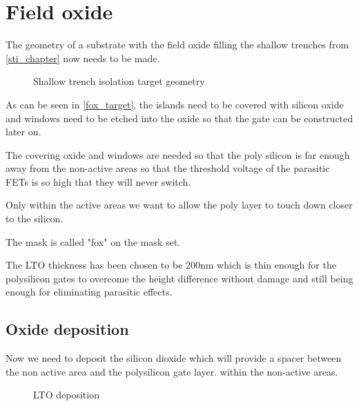 \section{Field oxide}\label{fox_chapter}

The geometry of a substrate with the field oxide filling the shallow trenches from \autoref{sti_chapter} now needs to be made.

\begin{figure}[H]
	\centering
	\begin{tikzpicture}[node distance = 3cm, auto, thick,scale=\CrossAndTopSectionBig, every node/.style={transform shape}]
		
	\end{tikzpicture}
	\caption{Shallow trench isolation target geometry}
	\label{fox_target}
\end{figure}

As can be seen in \autoref{fox_target}, the islands need to be covered with silicon oxide and windows need to be etched into the oxide so that the gate can be constructed later on.

The covering oxide and windows are needed so that the poly silicon is far enough away from the non-active areas so that the threshold voltage of the parasitic FETs is so high that they will never switch.

Only within the active areas we want to allow the poly layer to touch down closer to the silicon.

The mask is called "fox" on the mask set.

The LTO thickness has been chosen to be 200nm which is thin enough for the polysilicon gates to overcome the height difference without damage and still being enough for eliminating parasitic effects.

\newpage

\subsection{Oxide deposition}

Now we need to deposit the silicon dioxide which will provide a spacer between the non active area and the polysilicon gate layer. within the non-active areas.

\begin{figure}[H]
	\centering
	\begin{tikzpicture}[node distance = 3cm, auto, thick,scale=\CrossSectionOnly, every node/.style={transform shape}]
		
	\end{tikzpicture}
	\begin{tikzpicture}[node distance = 3cm, auto, thick,scale=\CrossSectionOnly, every node/.style={transform shape}]
		
	\end{tikzpicture}
	\caption{LTO deposition}
\end{figure}

